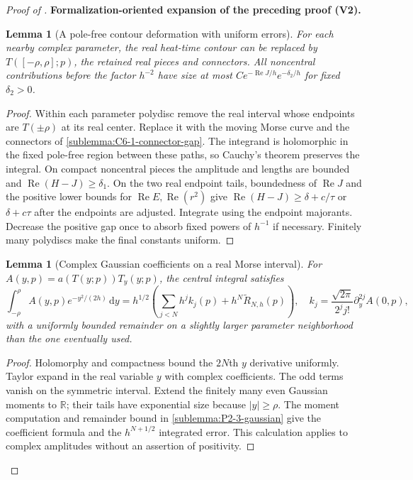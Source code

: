 \documentclass[11pt]{article}
\newtheorem{lemma}[theorem]{Lemma}
\newcommand{\formalisationparentid}{X}
\newenvironment{formalisationaddition}[1]{\par\medskip\begingroup\color{blue}\def\formalisationparentid{#1}\setcounter{formalizationsublemma}{0}\let\lemma\formalizationsublemma\let\endlemma\endformalizationsublemma
  \def\Eo{\mathcal E_h^\circ}\def\EE{\mathcal E_h}\def\phio{\phi_h^\circ}\def\phih{\phi_h}\def\Ho{H_h^{\rm atom}(v^\circ)}\def\Ha{H_h^{\rm atom}}\def\HL{H_h^{L}}\def\Dh{D_h}\def\Log{\operatorname{Log}}\def\ellh{\ell_h}\def\Gp{G_{p,h}}\def\Ast{A_{*,h}}\def\ahat{\widehat{\mathfrak a}_h}\def\ah{\mathfrak a_h}\def\rh{\widehat\rho_h}\def\deltah{\widehat\delta_h}\def\oldref##1{\textup{(##1)}}\def\interface##1{\par\noindent\textit{Analytical interface used here.} ##1\par}\def\finish{\par\noindent\textit{Conclusion of the formalization-oriented expansion.} }\par\noindent\textbf{Formalization-oriented expansion of the preceding proof (V2).}\par\smallskip
}{\par\endgroup\medskip
}
\newcommand{\R}{\mathbb R}
\newcommand{\Rea}{\operatorname{Re}}
\begin{document}
\begin{proof}[Proof of ]
\begin{formalisationaddition}{C-T6.1}
\begin{lemma}[A pole-free contour deformation with uniform errors]\label{sublemma:C6-1-contour}
For each nearby complex parameter, the real heat-time contour can be
replaced by $T([-\rho,\rho];p)$, the retained real pieces and connectors.
All noncentral contributions before the factor $h^{-2}$ have size at most
$C e^{-\Rea J/h}e^{-\delta_2/h}$ for fixed $\delta_2>0$.
\end{lemma}
\begin{proof}
Within each parameter polydisc remove the real interval whose endpoints
are $T(\pm\rho)$ at its real center. Replace it with the moving Morse
curve and the connectors of \ref{sublemma:C6-1-connector-gap}.
The integrand is holomorphic in the fixed pole-free region between these
paths, so Cauchy's theorem preserves the integral.
On compact noncentral pieces the amplitude and lengths are bounded and
$\Rea(H-J)\ge\delta_1$. On the two real endpoint tails, boundedness of
$\Rea J$ and the positive lower bounds for $\Rea E,\Rea(r^2)$ give
$\Rea(H-J)\ge\delta+c/\tau$ or $\delta+c\tau$ after the endpoints
are adjusted. Integrate using the endpoint majorants. Decrease the
positive gap once to absorb fixed powers of $h^{-1}$ if necessary.
Finitely many polydiscs make the final constants uniform.
\end{proof}

\begin{lemma}[Complex Gaussian coefficients on a real Morse interval]\label{sublemma:C6-1-gaussian-coefficients}
For $A(y,p)=a(T(y;p))T_y(y;p)$, the central integral satisfies
\[
 \int_{-\rho}^{\rho}A(y,p)e^{-y^2/(2h)}\,\mathrm dy
 =h^{1/2}\left(\sum_{j<N}h^jk_j(p)+h^N\widetilde R_{N,h}(p)\right),
 \quad k_j=\frac{\sqrt{2\pi}}{2^jj!}\partial_y^{2j}A(0,p),
\]
with a uniformly bounded remainder on a slightly larger parameter
neighborhood than the one eventually used.
\end{lemma}
\begin{proof}
Holomorphy and compactness bound the $2N$th $y$ derivative uniformly.
Taylor expand in the real variable $y$ with complex coefficients.
The odd terms vanish on the symmetric interval. Extend the finitely
many even Gaussian moments to $\R$; their tails have exponential size
because $|y|\ge\rho$. The moment computation and remainder bound in
\ref{sublemma:P2-3-gaussian} give the coefficient formula and the
$h^{N+1/2}$ integrated error. This calculation applies to complex
amplitudes without an assertion of positivity.
\end{proof}


\end{formalisationaddition}
\end{proof}
\end{document}
